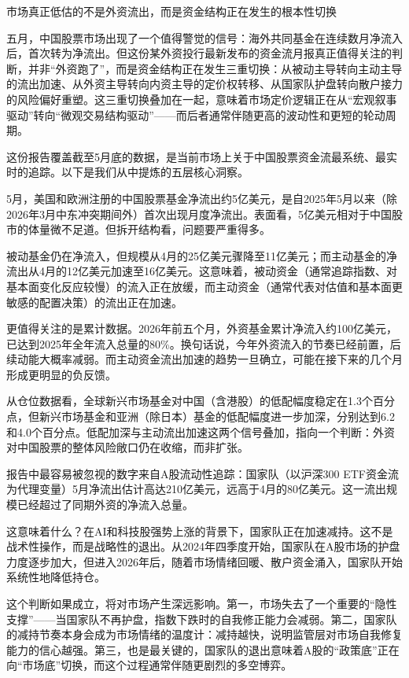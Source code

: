 \documentclass[11pt]{ctexart}
\begin{document}
市场真正低估的不是外资流出，而是资金结构正在发生的根本性切换

五月，中国股票市场出现了一个值得警觉的信号：海外共同基金在连续数月净流入后，首次转为净流出。但这份某外资投行最新发布的资金流月报真正值得关注的判断，并非“外资跑了”，而是资金结构正在发生三重切换：从被动主导转向主动主导的流出加速、从外资主导转向内资主导的定价权转移、从国家队护盘转向散户接力的风险偏好重塑。这三重切换叠加在一起，意味着市场定价逻辑正在从“宏观叙事驱动”转向“微观交易结构驱动”——而后者通常伴随更高的波动性和更短的轮动周期。

这份报告覆盖截至5月底的数据，是当前市场上关于中国股票资金流最系统、最实时的追踪。以下是我们从中提炼的五层核心洞察。

5月，美国和欧洲注册的中国股票基金净流出约5亿美元，是自2025年5月以来（除2026年3月中东冲突期间外）首次出现月度净流出。表面看，5亿美元相对于中国股市的体量微不足道。但拆开结构看，问题要严重得多。

被动基金仍在净流入，但规模从4月的25亿美元骤降至11亿美元；而主动基金的净流出从4月的12亿美元加速至16亿美元。这意味着，被动资金（通常追踪指数、对基本面变化反应较慢）的流入正在放缓，而主动资金（通常代表对估值和基本面更敏感的配置决策）的流出正在加速。

更值得关注的是累计数据。2026年前五个月，外资基金累计净流入约100亿美元，已达到2025年全年流入总量的80\%。换句话说，今年外资流入的节奏已经前置，后续动能大概率减弱。而主动资金流出加速的趋势一旦确立，可能在接下来的几个月形成更明显的负反馈。

从仓位数据看，全球新兴市场基金对中国（含港股）的低配幅度稳定在1.3个百分点，但新兴市场基金和亚洲（除日本）基金的低配幅度进一步加深，分别达到6.2和4.0个百分点。低配加深与主动流出加速这两个信号叠加，指向一个判断：外资对中国股票的整体风险敞口仍在收缩，而非扩张。

报告中最容易被忽视的数字来自A股流动性追踪：国家队（以沪深300 ETF资金流为代理变量）5月净流出估计高达210亿美元，远高于4月的80亿美元。这一流出规模已经超过了同期外资的净流入总量。

这意味着什么？在AI和科技股强势上涨的背景下，国家队正在加速减持。这不是战术性操作，而是战略性的退出。从2024年四季度开始，国家队在A股市场的护盘力度逐步加大，但进入2026年后，随着市场情绪回暖、散户资金涌入，国家队开始系统性地降低持仓。

这个判断如果成立，将对市场产生深远影响。第一，市场失去了一个重要的“隐性支撑”——当国家队不再护盘，指数下跌时的自我修正能力会减弱。第二，国家队的减持节奏本身会成为市场情绪的温度计：减持越快，说明监管层对市场自我修复能力的信心越强。第三，也是最关键的，国家队的退出意味着A股的“政策底”正在向“市场底”切换，而这个过程通常伴随更剧烈的多空博弈。
\end{document}
